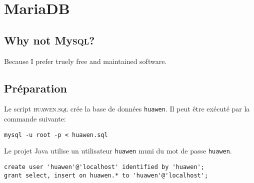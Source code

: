 \section{Maria\textsc{DB}}

\subsection{Why not My\textsc{sql}?} Because I prefer truely free and maintained software.

\subsection{Préparation}

Le script \textsc{huawen.sql} crée la base de données \texttt{huawen}. Il peut être exécuté par la commande suivante: 
\begin{lstlisting}[caption={Création de la base de données}]
mysql -u root -p < huawen.sql
\end{lstlisting}
Le projet Java utilise un utilisateur \texttt{huawen} muni du mot de passe \texttt{huawen}.
\begin{lstlisting}[caption={Création de l'utilisateur}]
create user 'huawen'@'localhost' identified by 'huawen';
grant select, insert on huawen.* to 'huawen'@'localhost';
\end{lstlisting}

